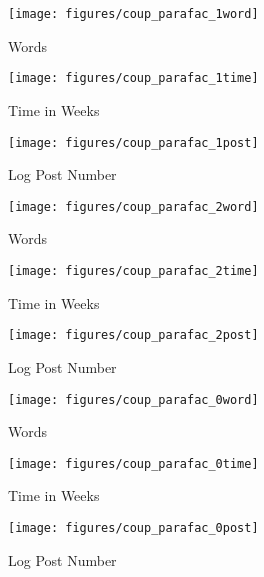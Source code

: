 \vspace{-0pt}

\begin{figure*}
\captionsetup[subfigure]{aboveskip=-1pt,belowskip=-1pt}
  \centering   
\begin{subfigure}[b]{0.31\textwidth}
                \texttt{[image: figures/coup\_parafac\_1word]}
                \caption{Words}
                \label{fig:coup_parafac_c1word}
        \end{subfigure}%
        \begin{subfigure}[b]{0.31\textwidth}
                \texttt{[image: figures/coup\_parafac\_1time]}
                \caption{Time in Weeks}
                \label{fig:coup_parafac_c1time}
        \end{subfigure}%
\begin{subfigure}[b]{0.31\textwidth}
                \texttt{[image: figures/coup\_parafac\_1post]}
                \caption{Log Post Number}
                \label{fig:coup_parafac_c1post}
        \end{subfigure}%
               
                \begin{subfigure}[b]{0.31\textwidth}
                \texttt{[image: figures/coup\_parafac\_2word]}
                \caption{Words}
                \label{fig:coup_parafac_c2word}
        \end{subfigure}%
        \begin{subfigure}[b]{0.31\textwidth}
                \texttt{[image: figures/coup\_parafac\_2time]}
                \caption{Time in Weeks}
                \label{fig:coup_parafac_c2time}
        \end{subfigure}%
\begin{subfigure}[b]{0.31\textwidth}
                \texttt{[image: figures/coup\_parafac\_2post]}
                \caption{Log Post Number}
                \label{fig:coup_parafac_c2post}
        \end{subfigure}%
        
        \begin{subfigure}[b]{0.31\textwidth}
                \texttt{[image: figures/coup\_parafac\_0word]}
                \caption{Words}
                \label{fig:coup_parafac_c0word}
        \end{subfigure}%
        \begin{subfigure}[b]{0.31\textwidth}
                \texttt{[image: figures/coup\_parafac\_0time]}
                \caption{Time in Weeks}
                \label{fig:coup_parafac_c0time}
        \end{subfigure}%
\begin{subfigure}[b]{0.31\textwidth}
                \texttt{[image: figures/coup\_parafac\_0post]}
                \caption{Log Post Number}
                \label{fig:coup_parafac_c0post}
        \end{subfigure}
        

\end{figure*}
